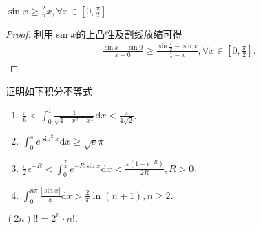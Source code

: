 \documentclass[../../main.tex]{subfiles}
\begin{document}
\begin{theorem}[Jordan不等式]\label{theorem:Jordan不等式}
$\sin x\geqslant \frac{2}{\pi}x,\forall x\in [0,\frac{\pi}{2}]$
\end{theorem}
\begin{proof}
利用$\sin x$的上凸性及割线放缩可得
\begin{align*}
\frac{\sin x-\sin 0}{x-0}\geqslant \frac{\sin \frac{\pi}{2}-\sin x}{\frac{\pi}{2}-x},\forall x\in \left[ 0,\frac{\pi}{2} \right] .
\end{align*}

\end{proof}

\begin{example}
证明如下积分不等式
\begin{enumerate}
\item \(\frac{\pi}{6} < \int_{0}^{1}\frac{1}{\sqrt{4 - x^{2}-x^{3}}}\mathrm{d}x < \frac{\pi}{4\sqrt{2}}\).

\item \(\int_{0}^{\pi}e^{\sin^{2}x}\mathrm{d}x \geqslant \sqrt{e}\pi\).

\item \(\frac{\pi}{2}e^{-R} < \int_{0}^{\frac{\pi}{2}}e^{-R\sin x}\mathrm{d}x < \frac{\pi(1 - e^{-R})}{2R}, R > 0\).

\item $\int_0^{n\pi}{\frac{\left| \sin x \right|}{x}\mathrm{d}x}>\frac{2}{\pi}\ln \left( n+1 \right) ,n\geqslant 2.$
\end{enumerate}
\end{example}
\begin{remark}
$(2n)!!=2^n\cdot n!.$
\end{remark}
\end{document}
